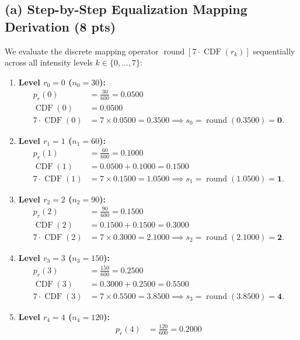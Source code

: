 \documentclass[11pt,a4paper]{article}
\begin{document}
\subsection{(a) Step-by-Step Equalization Mapping Derivation (8 pts)}
We evaluate the discrete mapping operator $\operatorname{round}[7 \cdot \operatorname{CDF}(r_k)]$ sequentially across all intensity levels $k \in \{0, \dots, 7\}$:
\begin{enumerate}
    \item \textbf{Level $r_0 = 0$ ($n_0 = 30$):}
    \begin{align}
    p_r(0) &= \frac{30}{600} = 0.0500 \\
    \operatorname{CDF}(0) &= 0.0500 \\
    7 \cdot \operatorname{CDF}(0) &= 7 \times 0.0500 = 0.3500 \implies s_0 = \operatorname{round}(0.3500) = \mathbf{0}.
    \end{align}
    \item \textbf{Level $r_1 = 1$ ($n_1 = 60$):}
    \begin{align}
    p_r(1) &= \frac{60}{600} = 0.1000 \\
    \operatorname{CDF}(1) &= 0.0500 + 0.1000 = 0.1500 \\
    7 \cdot \operatorname{CDF}(1) &= 7 \times 0.1500 = 1.0500 \implies s_1 = \operatorname{round}(1.0500) = \mathbf{1}.
    \end{align}
    \item \textbf{Level $r_2 = 2$ ($n_2 = 90$):}
    \begin{align}
    p_r(2) &= \frac{90}{600} = 0.1500 \\
    \operatorname{CDF}(2) &= 0.1500 + 0.1500 = 0.3000 \\
    7 \cdot \operatorname{CDF}(2) &= 7 \times 0.3000 = 2.1000 \implies s_2 = \operatorname{round}(2.1000) = \mathbf{2}.
    \end{align}
    \item \textbf{Level $r_3 = 3$ ($n_3 = 150$):}
    \begin{align}
    p_r(3) &= \frac{150}{600} = 0.2500 \\
    \operatorname{CDF}(3) &= 0.3000 + 0.2500 = 0.5500 \\
    7 \cdot \operatorname{CDF}(3) &= 7 \times 0.5500 = 3.8500 \implies s_3 = \operatorname{round}(3.8500) = \mathbf{4}.
    \end{align}
    \item \textbf{Level $r_4 = 4$ ($n_4 = 120$):}
    \begin{align}
    p_r(4) &= \frac{120}{600} = 0.2000 \\

\end{align}
\end{enumerate}
\end{document}
